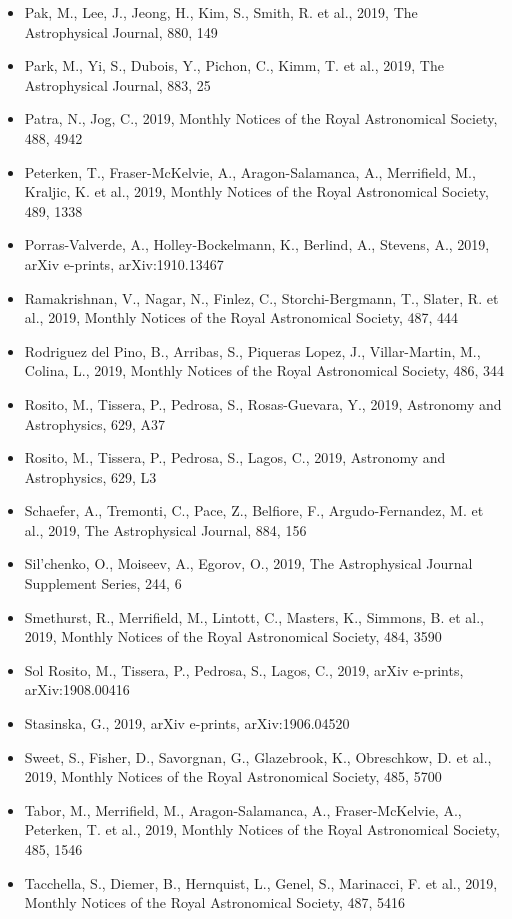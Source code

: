 \documentclass{letter}
\begin{document}
\begin{enumerate}
\begin{itemize}
\item Pak, M., Lee, J., Jeong, H., Kim, S., Smith, R. et al., 2019, The Astrophysical Journal, 880, 149
\item Park, M., Yi, S., Dubois, Y., Pichon, C., Kimm, T. et al., 2019, The Astrophysical Journal, 883, 25
\item Patra, N., Jog, C., 2019, Monthly Notices of the Royal Astronomical Society, 488, 4942
\item Peterken, T., Fraser-McKelvie, A., Aragon-Salamanca, A., Merrifield, M., Kraljic, K. et al., 2019, Monthly Notices of the Royal Astronomical Society, 489, 1338
\item Porras-Valverde, A., Holley-Bockelmann, K., Berlind, A., Stevens, A., 2019, arXiv e-prints, arXiv:1910.13467
\item Ramakrishnan, V., Nagar, N., Finlez, C., Storchi-Bergmann, T., Slater, R. et al., 2019, Monthly Notices of the Royal Astronomical Society, 487, 444
\item Rodriguez del Pino, B., Arribas, S., Piqueras Lopez, J., Villar-Martin, M., Colina, L., 2019, Monthly Notices of the Royal Astronomical Society, 486, 344
\item Rosito, M., Tissera, P., Pedrosa, S., Rosas-Guevara, Y., 2019, Astronomy and Astrophysics, 629, A37
\item Rosito, M., Tissera, P., Pedrosa, S., Lagos, C., 2019, Astronomy and Astrophysics, 629, L3
\item Schaefer, A., Tremonti, C., Pace, Z., Belfiore, F., Argudo-Fernandez, M. et al., 2019, The Astrophysical Journal, 884, 156
\item Sil'chenko, O., Moiseev, A., Egorov, O., 2019, The Astrophysical Journal Supplement Series, 244, 6
\item Smethurst, R., Merrifield, M., Lintott, C., Masters, K., Simmons, B. et al., 2019, Monthly Notices of the Royal Astronomical Society, 484, 3590
\item Sol Rosito, M., Tissera, P., Pedrosa, S., Lagos, C., 2019, arXiv e-prints, arXiv:1908.00416
\item Stasinska, G., 2019, arXiv e-prints, arXiv:1906.04520
\item Sweet, S., Fisher, D., Savorgnan, G., Glazebrook, K., Obreschkow, D. et al., 2019, Monthly Notices of the Royal Astronomical Society, 485, 5700
\item Tabor, M., Merrifield, M., Aragon-Salamanca, A., Fraser-McKelvie, A., Peterken, T. et al., 2019, Monthly Notices of the Royal Astronomical Society, 485, 1546
\item Tacchella, S., Diemer, B., Hernquist, L., Genel, S., Marinacci, F. et al., 2019, Monthly Notices of the Royal Astronomical Society, 487, 5416

\end{itemize}
\end{enumerate}
\end{document}
